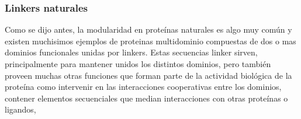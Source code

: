 % 
% 











\subsubsection{Linkers naturales}



% 



Como se dijo antes, la modularidad en proteínas naturales es algo muy común y existen muchisimos ejemplos de proteinas multidominio compuestas de dos o mas dominios funcionales unidas por linkers.
Estas secuencias linker sirven, principalmente para mantener unidos los distintos dominios, pero también proveen muchas otras funciones que forman parte de la actividad biológica de la proteína como 
intervenir en las interacciones cooperativas entre los dominios, contener elementos secuenciales que median interacciones con otras proteínas o ligandos, 

